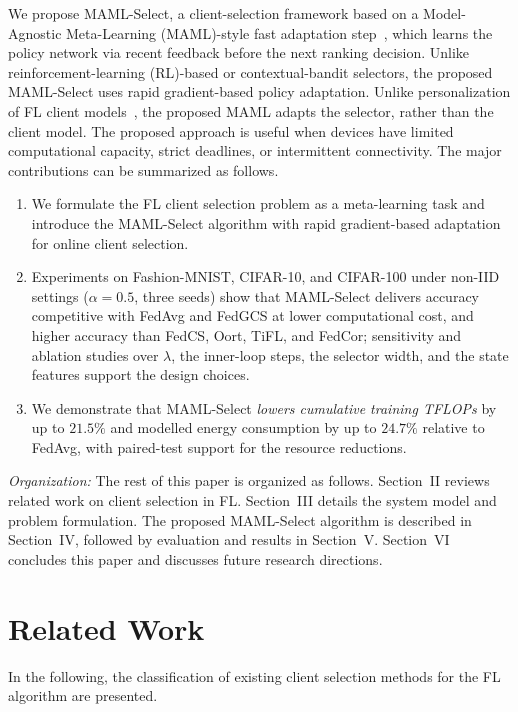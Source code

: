 \documentclass[journal]{IEEEtran}
\newcommand{\revision}[1]{#1}
\begin{document}
\revision{We propose MAML-Select, a client-selection framework based on a Model-Agnostic Meta-Learning (MAML)-style fast adaptation step~\cite{finn2017model}, which learns the policy network via recent feedback before the next ranking decision. Unlike reinforcement-learning (RL)-based or contextual-bandit selectors, the proposed MAML-Select uses rapid gradient-based policy adaptation. Unlike personalization of FL client models}~\cite{fallah2020personalized}, \revision{the proposed MAML adapts the selector, rather than the client model. The proposed approach is useful when devices have limited computational capacity, strict deadlines, or intermittent connectivity.} The major contributions can be summarized as follows.
\begin{enumerate}
\setlength{\itemsep}{0pt}
\setlength{\topsep}{1pt}
		\item We formulate the FL client selection problem as a meta-learning task and introduce the MAML-Select algorithm with \revision{rapid gradient-based} adaptation for online client selection.
        \item \revision{Experiments on Fashion-MNIST, CIFAR-10, and CIFAR-100 under non-IID settings ($\alpha = 0.5$, three seeds) show that MAML-Select delivers accuracy competitive with FedAvg and FedGCS at lower computational cost, and higher accuracy than FedCS, Oort, TiFL, and FedCor; sensitivity and ablation studies over $\lambda$, the inner-loop steps, the selector width, and the state features support the design choices.}
		\item We demonstrate that MAML-Select \revision{\textit{lowers cumulative training TFLOPs} by up to $21.5\%$ and modelled energy consumption by up to $24.7\%$ relative to FedAvg, with paired-test support for the resource reductions}.
\end{enumerate}

\textit{Organization:} The rest of this paper is organized as follows. Section~II reviews related work on client selection in FL. Section~III details the system model and problem formulation. The proposed MAML-Select algorithm is described in Section~IV, followed by evaluation and results in Section~V. Section~VI concludes this paper and discusses future research directions.

\section{Related Work}
In the following, the classification of existing client selection methods for the FL algorithm are presented. 
\end{document}
